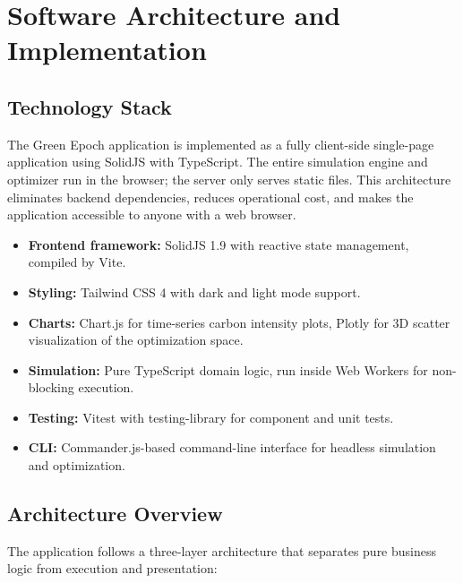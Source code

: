 
\chapter{Software Architecture and Implementation}
\label{sec:implementation}

\section{Technology Stack}
\label{sec:tech-stack}

The Green Epoch application is implemented as a fully client-side single-page
application using SolidJS with TypeScript.  The entire simulation engine
and optimizer run in the browser; the server only serves static files.  This
architecture eliminates backend dependencies, reduces operational cost, and
makes the application accessible to anyone with a web browser.

\begin{itemize}
  \item \textbf{Frontend framework:} SolidJS 1.9 with reactive state
    management, compiled by Vite.
  \item \textbf{Styling:} Tailwind CSS 4 with dark and light mode support.
  \item \textbf{Charts:} Chart.js for time-series carbon intensity plots,
    Plotly for 3D scatter visualization of the optimization space.
  \item \textbf{Simulation:} Pure TypeScript domain logic, run inside Web
    Workers for non-blocking execution.
  \item \textbf{Testing:} Vitest with testing-library for component and
    unit tests.
  \item \textbf{CLI:} Commander.js-based command-line interface for headless
    simulation and optimization.
\end{itemize}

\section{Architecture Overview}
\label{sec:architecture}

The application follows a three-layer architecture that separates pure business
logic from execution and presentation:

